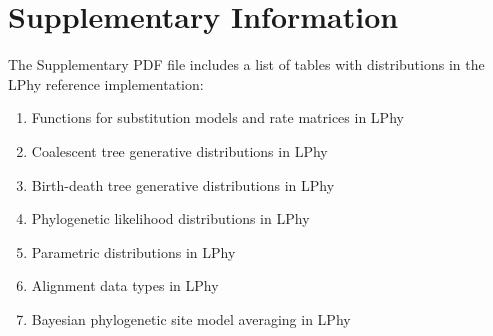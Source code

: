 \documentclass[10pt,letterpaper,table]{article}
\theoremstyle{definition}
\begin{document}
\nolinenumbers

%
%
% 


\section*{Supplementary Information}

The Supplementary PDF file includes a list of tables with distributions in the LPhy reference implementation: 

\begin{enumerate}[label=\bf S\arabic*]
\item Functions for substitution models and rate matrices in LPhy

\item Coalescent tree generative distributions in LPhy

\item Birth-death tree generative distributions in LPhy

\item Phylogenetic likelihood distributions in LPhy

\item Parametric distributions in LPhy

\item Alignment data types in LPhy

\item Bayesian phylogenetic site model averaging in LPhy
\end{enumerate}
\end{document}
